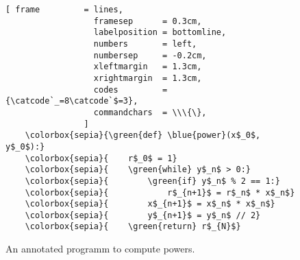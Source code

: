\begin{figure}[!h]
\centering
\begin{Verbatim}[ frame         = lines, 
                  framesep      = 0.3cm, 
                  labelposition = bottomline,
                  numbers       = left,
                  numbersep     = -0.2cm,
                  xleftmargin   = 1.3cm,
                  xrightmargin  = 1.3cm,
                  codes         = {\catcode`_=8\catcode`$=3},
                  commandchars  = \\\{\},
                ]
    \colorbox{sepia}{\green{def} \blue{power}(x$_0$, y$_0$):}
    \colorbox{sepia}{    r$_0$ = 1}
    \colorbox{sepia}{    \green{while} y$_n$ > 0:}
    \colorbox{sepia}{        \green{if} y$_n$ % 2 == 1:}
    \colorbox{sepia}{            r$_{n+1}$ = r$_n$ * x$_n$}
    \colorbox{sepia}{        x$_{n+1}$ = x$_n$ * x$_n$}
    \colorbox{sepia}{        y$_{n+1}$ = y$_n$ // 2}
    \colorbox{sepia}{    \green{return} r$_{N}$}
\end{Verbatim}
\vspace*{-0.3cm}
\caption{An annotated programm to compute powers.}
\label{fig:power-iterative-annotated.stlx}
\end{figure} %

